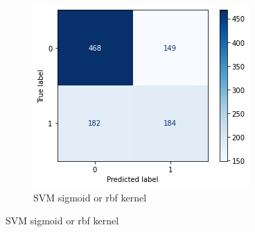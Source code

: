 \documentclass{article}
\begin{document}
\begin{figure}[!h]
\begin{subfigure}[b]{0.25\textwidth}
		\label{fig:three sin x}
	\end{subfigure}
	\hfill
	\begin{subfigure}[b]{0.25\textwidth}
		\centering
		\includegraphics[width=\textwidth]{../images/cmatrix-svm-sigmoid-rbf}
		\caption*{SVM sigmoid or rbf kernel}
		\label{fig:five over x}
	\end{subfigure}
	\label{fig:three graphs}
\end{figure}
\end{document}
